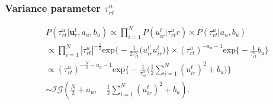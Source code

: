 \documentclass[a4paper]{article}
\begin{document}
\subsubsection{Variance parameter $\tau^u_{rt}$}
	\begin{equation}
	\begin{aligned}
	&P(\tau^u_{rt}|\boldsymbol{u}^t_r, a_u, b_u) \propto \prod_{i = 1}^N P(u^t_{ir}|\tau^u_{rt}r) \times P(\tau^u_{rt}|a_u, b_u) \\
	&\propto\prod_{i = 1}^N |\tau^u_{rt}|^{-\frac{1}{2}}\mbox{exp}\Big\{-\frac{1}{2\tau^u_{rt}}\big(u^{t\prime}_{ir}u^t_{ir}\big)\Big\}\times (\tau^u_{rt})^{-a_u-1}\mbox{exp}\Big\{-\frac{1}{\tau^u_{rt}}b_u\Big\}\\
	&\propto(\tau^u_{rt})^{-\frac{N}{2}-a_u-1}\mbox{exp}\Big\{-\frac{1}{\tau^u_{rt}}\Big(\frac{1}{2}\sum_{i = 1}^N ({u^t_{ir}})^2+b_u\Big)\Big\}\\
	&\sim \mathcal{IG}(\frac{N}{2}+a_u,\quad \frac{1}{2}\sum_{i = 1}^N ({u^t_{ir}})^2+b_u).
	\end{aligned}
	\end{equation}
\end{document}
